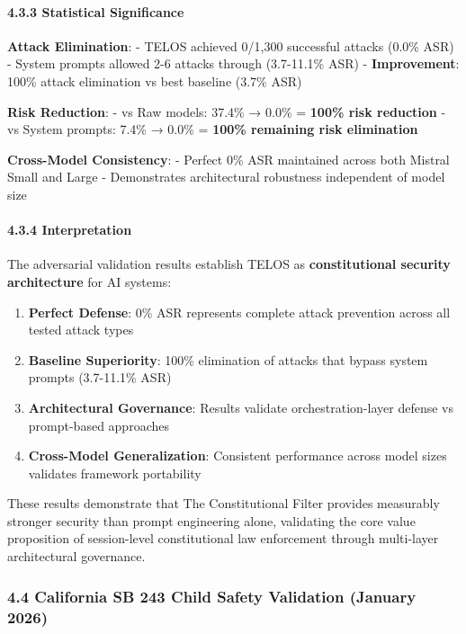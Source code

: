 \paragraph{4.3.3 Statistical
Significance}\label{statistical-significance}

\textbf{Attack Elimination}: - TELOS achieved 0/1,300 successful attacks
(0.0\% ASR) - System prompts allowed 2-6 attacks through (3.7-11.1\%
ASR) - \textbf{Improvement}: 100\% attack elimination vs best baseline
(3.7\% ASR)

\textbf{Risk Reduction}: - vs Raw models: 37.4\% → 0.0\% = \textbf{100\%
risk reduction} - vs System prompts: 7.4\% → 0.0\% = \textbf{100\%
remaining risk elimination}

\textbf{Cross-Model Consistency}: - Perfect 0\% ASR maintained across
both Mistral Small and Large - Demonstrates architectural robustness
independent of model size

\paragraph{4.3.4 Interpretation}\label{interpretation}

The adversarial validation results establish TELOS as
\textbf{constitutional security architecture} for AI systems:

\begin{enumerate}
\def\labelenumi{\arabic{enumi}.}
\tightlist
\item
  \textbf{Perfect Defense}: 0\% ASR represents complete attack
  prevention across all tested attack types
\item
  \textbf{Baseline Superiority}: 100\% elimination of attacks that
  bypass system prompts (3.7-11.1\% ASR)
\item
  \textbf{Architectural Governance}: Results validate
  orchestration-layer defense vs prompt-based approaches
\item
  \textbf{Cross-Model Generalization}: Consistent performance across
  model sizes validates framework portability
\end{enumerate}

These results demonstrate that The Constitutional Filter provides
measurably stronger security than prompt engineering alone, validating
the core value proposition of session-level constitutional law
enforcement through multi-layer architectural governance.

\subsubsection{4.4 California SB 243 Child Safety Validation (January
2026)}\label{california-sb-243-child-safety-validation-january-2026}

